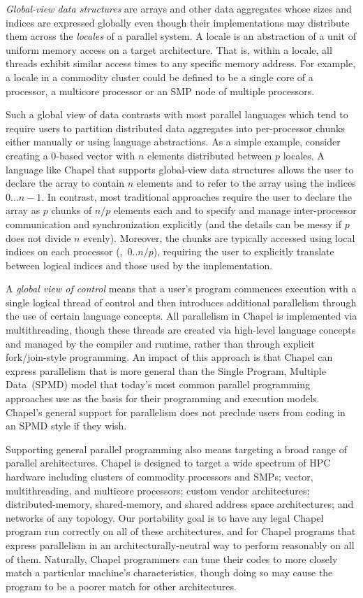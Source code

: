 \emph{Global-view data structures} are arrays and other data
aggregates whose sizes and indices are expressed globally even though
their implementations may distribute them across the \emph{locales} of
a parallel system.  A locale is an abstraction of a unit of uniform
memory access on a target architecture.  That is, within a locale, all
threads exhibit similar access times to any specific memory address.
For example, a locale in a commodity cluster could be defined to be a
single core of a processor, a multicore processor or an SMP node of
multiple processors.

Such a global view of data contrasts with most parallel languages
which tend to require users to partition distributed data aggregates
into per-processor chunks either manually or using language
abstractions.  As a simple example, consider creating a 0-based vector
with $n$ elements distributed between $p$ locales.  A language like
Chapel that supports global-view data structures allows the user to
declare the array to contain $n$ elements and to refer to the array
using the indices $0 \ldots n-1$.  In contrast, most traditional
approaches require the user to declare the array as $p$ chunks of
$n/p$ elements each and to specify and manage inter-processor
communication and synchronization explicitly (and the details can be
messy if $p$ does not divide $n$ evenly).  Moreover, the chunks are
typically accessed using local indices on each processor
(\eg,~$0..n/p$), requiring the user to explicitly translate between
logical indices and those used by the implementation.

A \emph{global view of control} means that a user's program commences
execution with a single logical thread of control and then introduces
additional parallelism through the use of certain language concepts.
All parallelism in Chapel is implemented via multithreading, though
these threads are created via high-level language concepts and managed
by the compiler and runtime, rather than through explicit
fork/join-style programming.  An impact of this approach is that
Chapel can express parallelism that is more general than the Single
Program, Multiple Data~(SPMD) model that today's most common parallel
programming approaches use as the basis for their programming and
execution models.  Chapel's general support for parallelism does not
preclude users from coding in an SPMD style if they wish.

Supporting general parallel programming also means targeting a broad
range of parallel architectures.  Chapel is designed to target a wide
spectrum of HPC hardware including clusters of commodity processors
and SMPs; vector, multithreading, and multicore processors; custom
vendor architectures; distributed-memory, shared-memory, and shared
address space architectures; and networks of any topology.  Our
portability goal is to have any legal Chapel program run correctly on
all of these architectures, and for Chapel programs that express
parallelism in an architecturally-neutral way to perform reasonably on
all of them.  Naturally, Chapel programmers can tune their codes to
more closely match a particular machine's characteristics, though
doing so may cause the program to be a poorer match for other
architectures.

